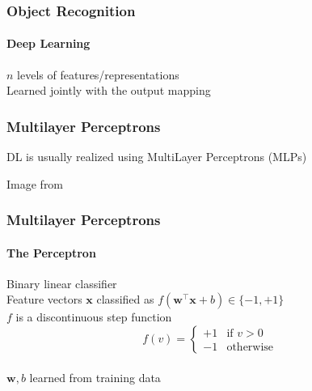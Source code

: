 \documentclass[xetex,professionalfont]{beamer}
\renewcommand{\vec}[1]{\ensuremath{\mathbf{#1}}}
\newcommand{\vw}{\vec{w}}
\newcommand{\vx}{\vec{x}}
\begin{document}

\begin{frame}
\frametitle{Object Recognition}
\framesubtitle{Deep Learning}

$n$ levels of features/representations\\\medskip
Learned jointly with the output mapping

\bigskip
\begin{center}
\end{center}

\end{frame}


\begin{frame}
\frametitle{Multilayer Perceptrons}

DL is usually realized using MultiLayer Perceptrons (MLPs) %

\bigskip
\begin{center}
	{\centering Image from \cite{bishop2006}}
\end{center}

\end{frame}


\begin{frame}
\frametitle{Multilayer Perceptrons}
\framesubtitle{The Perceptron}

Binary linear classifier\\\medskip
Feature vectors $\vx$ classified as $f(\vw^\top\vx+b)\in\{-1,+1\}$\\\medskip %
$f$ is a discontinuous step function %
\[
f(v)=\begin{cases}
	+1 & \text{if } v>0\\
	-1 & \text{otherwise}
\end{cases}
\]\\\medskip
$\vw,b$ learned from training data %

\end{frame}
\end{document}
